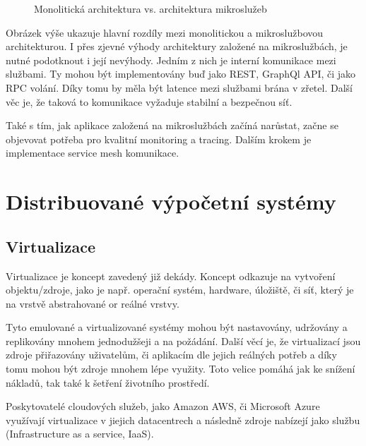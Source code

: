 \documentclass[thesis=M,czech]{FITthesis}[2019/12/23]
\theoremstyle{plain}
\theoremstyle{definition}
\begin{document}
\begin{figure}[H]\centering
	

	\caption[Monolitická architektura vs. architektura mikroslužeb]{Monolitická architektura vs. architektura mikroslužeb}\label{fig:float}
\end{figure}


Obrázek výše ukazuje hlavní rozdíly mezi monolitickou a mikroslužbovou architekturou. I přes zjevné výhody architektury založené na mikroslužbách, je nutné podotknout i její nevýhody. Jedním z nich je interní komunikace mezi službami. Ty mohou být implementovány buď jako REST, GraphQl API, či jako RPC volání. Díky tomu by měla být latence mezi službami brána v zřetel. Další věc je, že taková to komunikace vyžaduje stabilní a bezpečnou síť.

Také s tím, jak aplikace založená na mikroslužbách začíná narůstat, začne se objevovat potřeba pro kvalitní monitoring a tracing. Dalším krokem je implementace service mesh komunikace.



\section{Distribuované výpočetní systémy}



\subsection{Virtualizace}

Virtualizace je koncept zavedený již dekády. Koncept odkazuje na vytvoření objektu/zdroje, jako je např. operační systém, hardware, úložiště, či síť, který je na vrstvě abstrahované or reálné vrstvy.

Tyto emulované a virtualizované systémy mohou být nastavovány, udržovány a replikovány mnohem jednodužšeji a na požádání. Další věcí je, že virtualizací jsou zdroje přiřazovány uživatelům, či aplikacím dle jejich reálných potřeb a díky tomu mohou být zdroje mnohem lépe využity. Toto velice pomáhá jak ke snížení nákladů, tak také k šetření životního prostředí. 

Poskytovatelé cloudových služeb, jako Amazon AWS, či Microsoft Azure využívají virtualizace v jiejich datacentrech a následně zdroje nabízejí jako službu (Infrastructure as a service, IaaS). 
\end{document}
